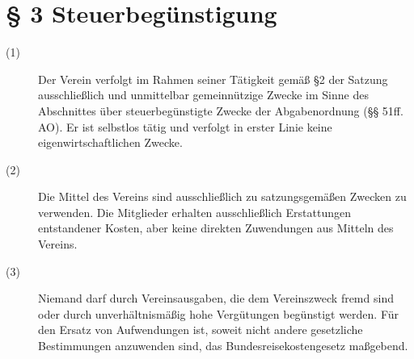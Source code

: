 \documentclass[a4paper,12pt]{scrartcl}
\begin{document}
\section*{\S{} 3 Steuerbegünstigung}
\begin{description} 

\item[(1)] Der Verein verfolgt im Rahmen seiner Tätigkeit gemäß §2 der Satzung ausschließlich und unmittelbar gemeinnützige Zwecke im Sinne des Abschnittes über steuerbegünstigte Zwecke der Abgabenordnung (§§ 51ff. AO). Er ist selbstlos tätig und verfolgt in erster Linie keine eigenwirtschaftlichen Zwecke.

\item[(2)] Die Mittel des Vereins sind ausschließlich zu satzungsgemäßen Zwecken zu verwenden. Die Mitglieder erhalten ausschließlich Erstattungen entstandener Kosten, aber keine direkten Zuwendungen aus Mitteln des Vereins.

\item[(3)] Niemand darf durch Vereinsausgaben, die dem Vereinszweck fremd sind oder durch unverhältnismäßig hohe Vergütungen begünstigt werden. Für den Ersatz von Aufwendungen ist, soweit nicht andere gesetzliche Bestimmungen anzuwenden sind, das Bundesreisekostengesetz maßgebend.

\end{description}
\end{document}
